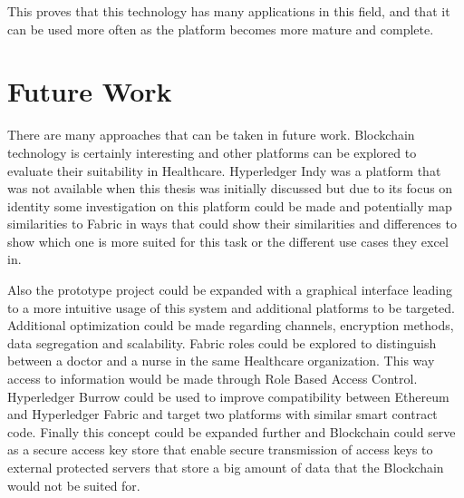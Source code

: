 This proves that this technology has many applications in this field, and that
it can be used more often as the platform becomes more mature and complete.

\section{Future Work} \label{futureWork}

There are many approaches that can be taken in future work. Blockchain
technology is certainly interesting and other platforms can be explored to
evaluate their suitability in Healthcare. Hyperledger Indy was a platform that
was not available when this thesis was initially discussed but due to its focus
on identity some investigation on this platform could be made and potentially
map similarities to Fabric in ways that could show their similarities and
differences to show which one is more suited for this task or the different use
cases they excel in.

Also the prototype project could be expanded with a graphical interface leading
to a more intuitive usage of this system and additional platforms to be
targeted. Additional optimization could be made regarding channels, encryption
methods, data segregation and scalability. Fabric roles could be explored to
distinguish between a doctor and a nurse in the same Healthcare organization.
This way access to information would be made through Role Based Access Control.
Hyperledger Burrow could be used to improve compatibility between Ethereum and
Hyperledger Fabric and target two platforms with similar smart contract code.
Finally this concept could be expanded further and Blockchain could serve as a
secure access key store that enable secure transmission of access keys to
external protected servers that store a big amount of data that the Blockchain
would not be suited for.
